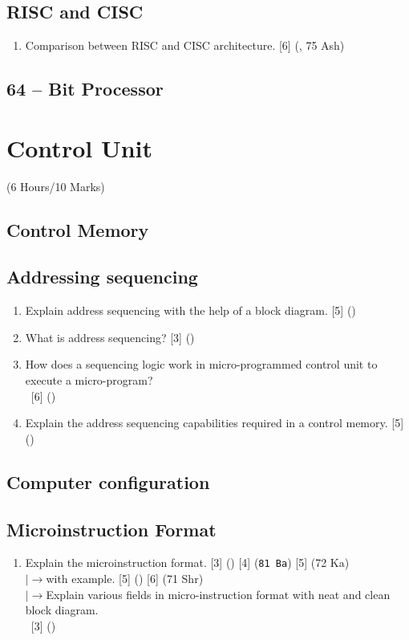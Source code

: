 \documentclass[12pt]{article}
\newcommand{\lb}{\\$\left|\rightarrow\right.$}
\newcommand{\enter}{\\\textcolor{white}{1}}
\begin{document}
	\subsection{RISC and CISC}
	\begin{enumerate}[noitemsep, topsep = 0pt]
		\item Comparison between RISC and CISC architecture. \hfill [6] (, 75 Ash)
	\end{enumerate}
	\subsection{64 – Bit Processor}

	\pagebreak
\section{Control Unit}
	\begin{center}(6 Hours/10 Marks)\end{center} 
	\subsection{Control Memory}
	
	\subsection{Addressing sequencing}
		\begin{enumerate}
			\item Explain address sequencing with the help of a block diagram. \hfill [5] ()
			
			\item What is address sequencing? \hfill [3] ()
			
			\item How does a sequencing logic work in micro-programmed control unit to execute a micro-program?
			\enter\hfill [6] ()
			\item Explain the address sequencing capabilities required in a control memory. \hfill [5] ()
		\end{enumerate}
	
	\subsection{Computer configuration}
	
	\subsection{Microinstruction Format}
		\begin{enumerate}[noitemsep, topsep=0pt]
			\item Explain the microinstruction format.  \hfill [3] () [4] (\texttt{81 Ba}) [5] (72 Ka)
			\lb with example. \hfill [5] () [6] (71 Shr)
			\lb Explain various fields in micro-instruction format with neat and clean block diagram.
			\enter\hfill [3] ()
		\end{enumerate}
		
\end{document}
